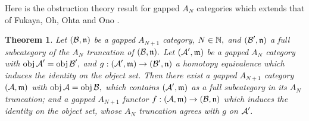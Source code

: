 \documentclass{article}
\theoremstyle{plain}%
\newtheorem{thm}{Theorem}[section]
\theoremstyle{definition}
\numberwithin{equation}{section}
\numberwithin{figure}{section}
\def\l{\label}
\def\fm{{\mathfrak m}}
\def\fn{{\mathfrak n}}
\def\cA{{\mathbin{\cal A}}}
\def\cB{{\mathbin{\cal B}}}
\begin{document}
Here is the obstruction theory result for gapped $A_N$ categories which extends that of Fukaya, Oh, Ohta and Ono \cite[Theorem 7.2.72]{FOOO}.
\begin{thm}\l{thm: ob1}
Let $(\cB,\fn)$ be a gapped $A_{N+1}$ category, $N\in{\mathbb N},$ and $(\cB',\fn)$ a full subcategory of the $A_N$ truncation of $(\cB,\fn).$
Let $(\cA',\fm)$ be a gapped $A_N$ category with $\obj\cA'=\obj\cB',$ and $g:(\cA',\fm)\to(\cB',\fn)$ a homotopy equivalence which induces the identity on the object set.
Then there exist a gapped $A_{N+1}$ category $(\cA,\fm)$ with $\obj\cA=\obj\cB,$ which contains $(\cA',\fm)$ as a full subcategory in its $A_N$ truncation; and a gapped $A_{N+1}$ functor $f:(\cA,\fm)\to(\cB,\fn)$ which induces the identity on the object set, whose $A_N$ truncation agrees with $g$ on $\cA'.$
\end{thm}
\end{document}
